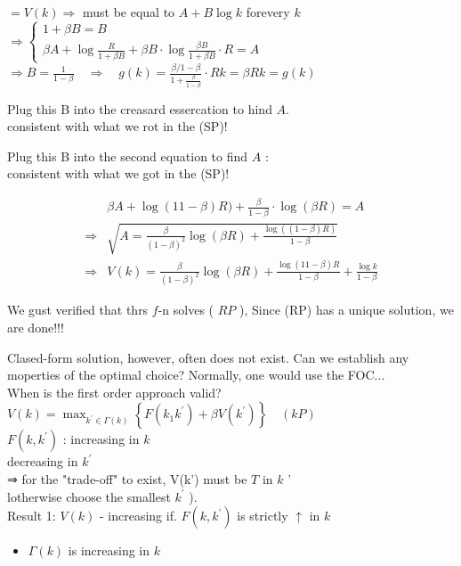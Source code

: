 \documentclass[10pt]{article}
\begin{document}
$=V(k) \Rightarrow$ must be equal to $A+B \log k$ forevery $k$\\
$\Rightarrow\left\{\begin{array}{l}1+\beta B=B \\ \beta A+\log \frac{R}{1+\beta B}+\beta B \cdot \log \frac{\beta B}{1+\beta B} \cdot R=A\end{array}\right.$\\
$\Rightarrow B=\frac{1}{1-\beta} \quad \Rightarrow \quad g(k)=\frac{\beta / 1-\beta}{1+\frac{\beta}{1-\beta}} \cdot R k=\beta R k=g(k)$

Plug this B into the creasard essercation to hind $A$.\\
consistent with what we rot in the (SP)!

Plug this B into the second equation to find $A$ :\\
consistent with what we got in the (SP)!

$$
\begin{aligned}
& \beta A+\log (11-\beta) R)+\frac{\beta}{1-\beta} \cdot \log (\beta R)=A \\
\Rightarrow & \sqrt{A=\frac{\beta}{(1-\beta)^{2}} \log (\beta R)+\frac{\log ((1-\beta) R)}{1-\beta}} \\
\Rightarrow & V(k)=\frac{\beta}{(1-\beta)^{2}} \log (\beta R)+\frac{\log (11-\beta) R}{1-\beta}+\frac{\log k}{1-\beta}
\end{aligned}
$$

We gust verified that thrs $f$-n solves ( $R P$ ), Since (RP) has a unique solution, we are done!!!

Clased-form solution, however, often does not exist. Can we establish any moperties of the optimal choice? Normally, one would use the FOC...\\
When is the first order approach valid?\\
$V(k)=\max _{k^{\prime} \in \Gamma(k)}\left\{F\left(k_{1} k^{\prime}\right)+\beta V\left(k^{\prime}\right)\right\} \quad(k P)$\\
$F\left(k, k^{\prime}\right)$ : increasing in $k$\\
decreasing in $k^{\prime}$\\
⇒ for the "trade-off" to exist, V(k') must be $T$ in $k$ '\\
lotherwise choose the smallest $k^{\prime}$ ).\\
Result 1: $V(k)$ - increasing if. $F\left(k, k^{\prime}\right)$ is strictly $\uparrow$ in $k$

\begin{itemize}
  \item $\Gamma(k)$ is increasing in $k$
\end{itemize}
\end{document}

